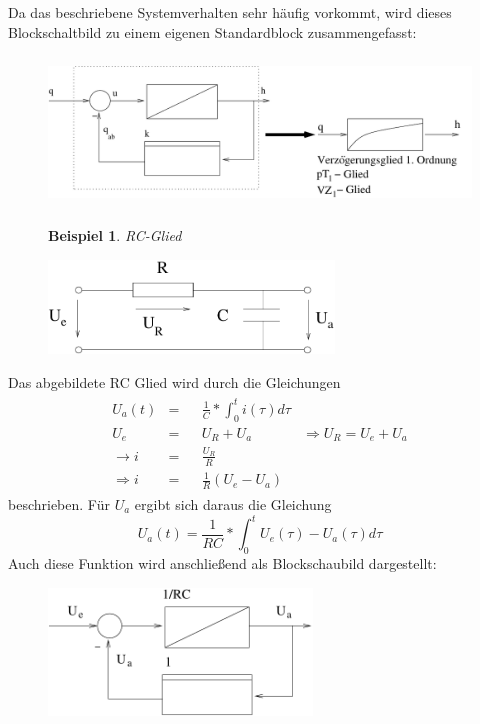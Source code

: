 \message{ !name(Mitschrieb_SysRegel.tex)}\documentclass[12pt,a4paper,ngerman]{scrartcl}
\newtheorem{bsp}{Beispiel}[section] %
\begin{document}
Da das beschriebene Systemverhalten sehr häufig vorkommt, wird dieses Blockschaltbild zu einem eigenen Standardblock zusammengefasst:
\begin{figure}[H]
\includegraphics[height=4cm]{sysregel_pt1}
\end{figure}
\begin{figure}[H]
\begin{bsp}
RC-Glied
\end{bsp}

\includegraphics[height=2.5cm]{sysregel_RC}
\end{figure}
Das abgebildete RC Glied wird durch die Gleichungen
\begin{align*}
  \begin{array}{lrlll}
  U_a(t)&=&&\frac{1}{C}*\int_0^t{i(\tau)d\tau}\\
  U_e&=&&U_R+U_a &\Rightarrow U_R=U_e+U_a\\
  \rightarrow i&=&&\frac{U_R}{R}\\
  \Rightarrow i&=&&\frac{1}{R}(U_e-U_a)
 \end{array}
\end{align*}
beschrieben. Für $U_a$ ergibt sich daraus die Gleichung
\begin{equation*}
  U_a(t)=\frac{1}{RC}*\int_0^t{U_e(\tau)-U_a(\tau)d\tau}
\end{equation*}
Auch diese Funktion wird anschließend als Blockschaubild dargestellt:
\begin{figure}[H]
\includegraphics[width=7cm]{sysregel_bsb3}
\end{figure}
\end{document}
